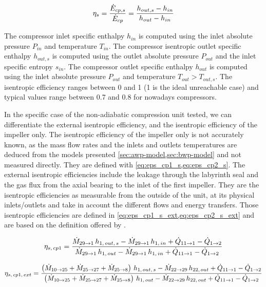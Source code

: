 \begin{equation}
  \label{eq:eta_s_cp}
  \eta_s = \dfrac{\dot{E}_{cp,s}}{\dot{E}_{cp}} = \dfrac{h_{out,s} - h_{in}}
  {h_{out} - h_{in}}
  \tagaddtextone{$\left[ - \right]$}
\end{equation}

The compressor inlet specific enthalpy $h_{in}$ is computed using the
inlet absolute pressure $P_{in}$ and temperature $T_{in}$. The
compressor isentropic outlet specific enthalpy $h_{out,s}$ is computed
using the outlet absolute pressure $P_{out}$ and the inlet specific
entropy $s_{in}$. The compressor outlet specific enthalpy $h_{out}$ is
computed using the inlet absolute pressure $P_{out}$ and temperature
$T_{out} > T_{out,s}$. The isentropic efficiency ranges between 0 and
1 (1 is the ideal unreachable case) and typical values range between
0.7 and 0.8 for nowadays compressors.

In the specific case of the non-adiabatic compression unit tested, we
can differentiate the external isentropic efficiency, and the
isentropic efficiency of the impeller only. The isentropic efficiency
of the impeller only is not accurately known, as the mass flow rates
and the inlets and outlets temperatures are deduced from the models
presented \cref{sec:awp-model,sec:bwp-model} and not measured
directly. They are defined with \cref{eq:eps_cp1_s,eq:eps_cp2_s}. The
external isentropic efficiencies include the leakage through the
labyrinth seal and the gas flux from the axial bearing to the inlet of
the first impeller. They are the isentropic efficiencies as measurable
from the outside of the unit, at its physical inlets/outlets and take
in account the different flows and energy transfers. Those isentropic
efficiencies are defined in \cref{eq:eps_cp1_s_ext,eq:eps_cp2_s_ext}
and are based on the definition offered by
\citet[p.\,201]{Borel-Favrat-2010a}.

\begin{equation}
  \label{eq:eps_cp1_s}
  \eta_{s,\,cp1} = \dfrac{\dotM{29}{1} \, h_{1,\,out,\,s} -
    \dotM{29}{1} \, h_{1,\,in} + \dot{Q}_{11 \rightarrow 1} -
    \dot{Q}_{1 \rightarrow 2}}{\dotM{29}{1} \, h_{1,\,out} - \dotM{29}{1} \,
    h_{1,\,in} + \dot{Q}_{11 \rightarrow 1} - \dot{Q}_{1 \rightarrow 2}}
  \tagaddtextone{$\left[-\right]$}
\end{equation}

\begin{equation}
  \label{eq:eps_cp1_s_ext}
  \eta_{s,\,cp1,\,ext} = \dfrac{\left( \dotM{10}{25} + \dotM{25}{27} +
      \dotM{25}{8} \right) \, h_{1,\,out,\,s} - \dotM{22}{29} \,
    h_{22,\,out} + \dot{Q}_{11 \rightarrow 1} - \dot{Q}_{1
      \rightarrow 2}}{\left( \dotM{10}{25} + \dotM{25}{27} +
      \dotM{25}{8} \right) \, h_{1,\,out} - \dotM{22}{29} \,
    h_{22,\,out} + \dot{Q}_{11 \rightarrow 1} - \dot{Q}_{1
      \rightarrow 2}}
  \tagaddtextone{$\left[-\right]$}
\end{equation}

